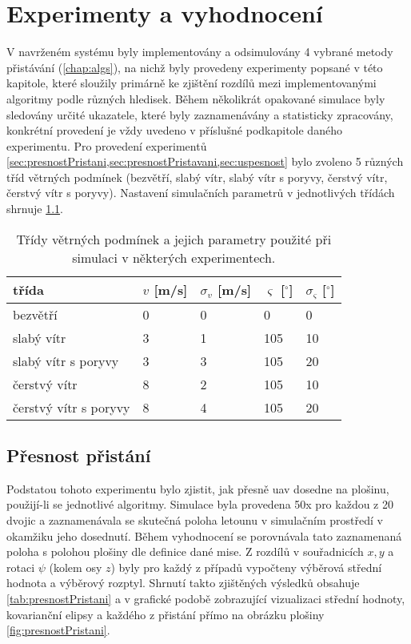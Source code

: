 \chapter{Experimenty a vyhodnocení} \label{chap:eval}
  V navrženém systému byly implementovány a odsimulovány 4 vybrané metody přistávání (\cref{chap:algs}), na nichž byly provedeny experimenty popsané v této kapitole, které sloužily primárně ke zjištění rozdílů mezi implementovanými algoritmy podle různých hledisek. Během několikrát opakované simulace byly sledovány určité ukazatele, které byly zaznamenávány a statisticky zpracovány, konkrétní provedení je vždy uvedeno v příslušné podkapitole daného experimentu. Pro provedení experimentů \cref*{sec:presnostPristani,sec:presnostPristavani,sec:uspesnost} bylo zvoleno 5 různých tříd větrných podmínek (bezvětří, slabý vítr, slabý vítr s poryvy, čerstvý vítr, čerstvý vítr s poryvy). Nastavení simulačních parametrů v jednotlivých třídách shrnuje \cref{tab:tridyVetru}.
  \begin{table}
    \centering
    \begin{tabular}{@{}lllll@{}}
      \hline
      třída & $v$ [m/s] & $\sigma_v$ [m/s] & $\varsigma$ [$^{\circ}$] & $\sigma_\varsigma$ [$^{\circ}$] \bigstrut\\
      \hline
      bezvětří & 0     & 0     & 0     & 0 \bigstrut[t]\\
      slabý vítr & 3     & 1     & 105   & 10 \\
      slabý vítr s poryvy & 3     & 3     & 105   & 20 \\
      čerstvý vítr & 8     & 2     & 105   & 10 \\
      čerstvý vítr s poryvy & 8     & 4     & 105   & 20 \bigstrut[b]\\
      \hline
      \end{tabular}%
    \caption[Třídy větrných podmínek]{Třídy větrných podmínek a jejich parametry použité při simulaci v některých experimentech.}
    \label{tab:tridyVetru}
  \end{table}
  \section{Přesnost přistání} \label{sec:presnostPristani}
    Podstatou tohoto experimentu bylo zjistit, jak přesně \acrshort{uav} dosedne na plošinu, použijí-li se jednotlivé algoritmy. Simulace byla provedena 50x pro každou z 20 dvojic a zaznamenávala se skutečná poloha letounu v simulačním prostředí v okamžiku jeho dosednutí. Během vyhodnocení se porovnávala tato zaznamenaná poloha s polohou plošiny dle definice dané mise. Z rozdílů v souřadnicích $x, y$ a rotaci $\psi$ (kolem osy $z$) byly pro každý z případů vypočteny výběrová střední hodnota a výběrový rozptyl. Shrnutí takto zjištěných výsledků obsahuje \cref{tab:presnostPristani} a v grafické podobě zobrazující vizualizaci střední hodnoty, kovarianční elipsy a každého z přistání přímo na obrázku plošiny \cref{fig:presnostPristani}.
